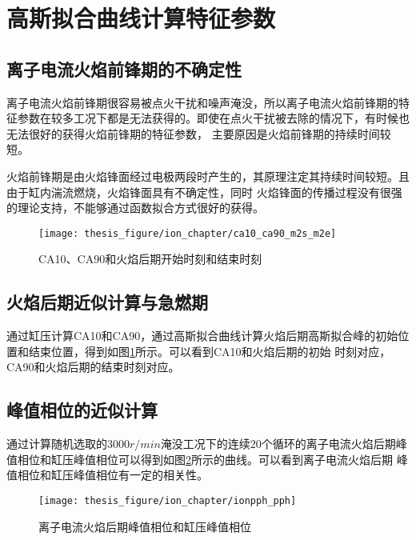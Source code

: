 \section{高斯拟合曲线计算特征参数}
\subsection{离子电流火焰前锋期的不确定性}
离子电流火焰前锋期很容易被点火干扰和噪声淹没，所以离子电流火焰前锋期的特征参数在较多工况下都是无法获得的\cite{wxm2001,zxc2008}。即使在点火干扰被去除的情况下，有时候也无法很好的获得火焰前锋期的特征参数，
主要原因是火焰前锋期的持续时间较短。\par
火焰前锋期是由火焰锋面经过电极两段时产生的，其原理注定其持续时间较短。且由于缸内湍流燃烧，火焰锋面具有不确定性，同时
火焰锋面的传播过程没有很强的理论支持，不能够通过函数拟合方式很好的获得。
\begin{figure}[htb]
	\centering
	\texttt{[image: thesis\_figure/ion\_chapter/ca10\_ca90\_m2s\_m2e]}
	\caption{\label{fig:ca10_ca90_m2s_m2e}CA10、CA90和火焰后期开始时刻和结束时刻}
\end{figure}
\subsection{火焰后期近似计算与急燃期}
通过缸压计算CA10和CA90，通过高斯拟合曲线计算火焰后期高斯拟合峰的初始位置和结束位置，得到如图\ref{fig:ca10_ca90_m2s_m2e}所示。可以看到CA10和火焰后期的初始
时刻对应，CA90和火焰后期的结束时刻对应。
\subsection{峰值相位的近似计算}
通过计算随机选取的$3000r/min$淹没工况下的连续20个循环的离子电流火焰后期峰值相位和缸压峰值相位可以得到如图\ref{fig:ionpph_pph}所示的曲线。可以看到离子电流火焰后期
峰值相位和缸压峰值相位有一定的相关性。
\begin{figure}[htb]
	\centering
	\texttt{[image: thesis\_figure/ion\_chapter/ionpph\_pph]}
	\caption{\label{fig:ionpph_pph}离子电流火焰后期峰值相位和缸压峰值相位}
\end{figure}

